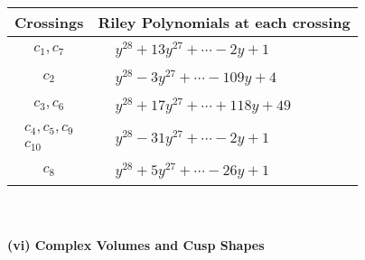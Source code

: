 \documentclass[1p]{elsarticle_modified}
\theoremstyle{definition}
\begin{document}
\begin{tabular}{m{50pt}|m{274pt}}
Crossings & \hspace{64pt}Riley Polynomials at each crossing \\
\hline $$\begin{aligned}c_{1},c_{7}\end{aligned}$$&$\begin{aligned}
&y^{28}+13 y^{27}+\cdots-2 y+1
\end{aligned}$\\
\hline $$\begin{aligned}c_{2}\end{aligned}$$&$\begin{aligned}
&y^{28}-3 y^{27}+\cdots-109 y+4
\end{aligned}$\\
\hline $$\begin{aligned}c_{3},c_{6}\end{aligned}$$&$\begin{aligned}
&y^{28}+17 y^{27}+\cdots+118 y+49
\end{aligned}$\\
\hline $$\begin{aligned}c_{4},c_{5},c_{9}\\c_{10}\end{aligned}$$&$\begin{aligned}
&y^{28}-31 y^{27}+\cdots-2 y+1
\end{aligned}$\\
\hline $$\begin{aligned}c_{8}\end{aligned}$$&$\begin{aligned}
&y^{28}+5 y^{27}+\cdots-26 y+1
\end{aligned}$\\
\hline
\end{tabular}\\~\\
\newpage\flushleft \textbf{(vi) Complex Volumes and Cusp Shapes}
\end{document}
